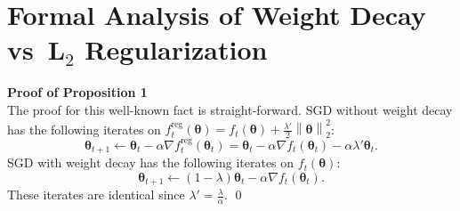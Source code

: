 \documentclass[usenames,dvipsnames]{article} %
\newcommand{\norm}[1]{\left\lVert#1\right\rVert}
\newtheorem{prop}{Proposition}
\newtheorem{define}{Definition}
\begin{document}
\section{Formal Analysis of Weight Decay vs\ L$_2$ Regularization}
\label{sec:decay_vs_L_2}



\noindent{}\textbf{Proof of Proposition 1}\\
The proof for this well-known fact is straight-forward.
SGD without weight decay has the following iterates on $f_{t}^{\text{reg}}(\bm{\theta}) = f_t(\bm{\theta}) + \frac{\lambda'}{2} \norm{\bm{\theta}}_2^2$: 
\begin{equation}
\label{eq:sgdl2}
\bm{\theta}_{t+1} \leftarrow \bm{\theta}_t - \alpha \nabla f_{t}^{\text{reg}}(\bm{\theta}_t) = \bm{\theta}_t - \alpha \nabla f_t(\bm{\theta}_t) - \alpha  \lambda' \bm{\theta}_t.
\end{equation}
SGD with weight decay has the following iterates on $f_t(\bm{\theta})$: 
\begin{equation}
\label{eq:sgdwd}
\bm{\theta}_{t+1} \leftarrow (1 - \lambda) \bm{\theta}_t - \alpha \nabla f_t(\bm{\theta}_t).
\end{equation}
These iterates are identical since $\lambda' = \frac{\lambda}{\alpha}$. \qed
\end{document}
